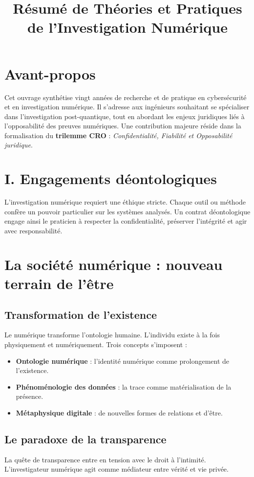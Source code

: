 \documentclass[a4paper,12pt]{article}
\title{Résumé de \og Théories et Pratiques de l’Investigation Numérique \fg}
\date{}
\begin{document}
\maketitle

\section*{Avant-propos}
Cet ouvrage synthétise vingt années de recherche et de pratique en cybersécurité et en investigation numérique. 
Il s’adresse aux ingénieurs souhaitant se spécialiser dans l’investigation post-quantique, tout en abordant 
les enjeux juridiques liés à l’opposabilité des preuves numériques. 
Une contribution majeure réside dans la formalisation du \textbf{trilemme CRO} : 
\textit{Confidentialité, Fiabilité et Opposabilité juridique}.

\section*{I. Engagements déontologiques}
L’investigation numérique requiert une éthique stricte. 
Chaque outil ou méthode confère un pouvoir particulier sur les systèmes analysés. 
Un contrat déontologique engage ainsi le praticien à respecter la confidentialité, 
préserver l’intégrité et agir avec responsabilité.

\section{La société numérique : nouveau terrain de l’être}
\subsection{Transformation de l’existence}
Le numérique transforme l’ontologie humaine. L’individu existe à la fois physiquement et 
numériquement. Trois concepts s’imposent :
\begin{itemize}
\item \textbf{Ontologie numérique} : l’identité numérique comme prolongement de l’existence.
\item \textbf{Phénoménologie des données} : la trace comme matérialisation de la présence.
\item \textbf{Métaphysique digitale} : de nouvelles formes de relations et d’être.
\end{itemize}

\subsection{Le paradoxe de la transparence}
La quête de transparence entre en tension avec le droit à l’intimité. 
L’investigateur numérique agit comme médiateur entre vérité et vie privée.
\end{document}
